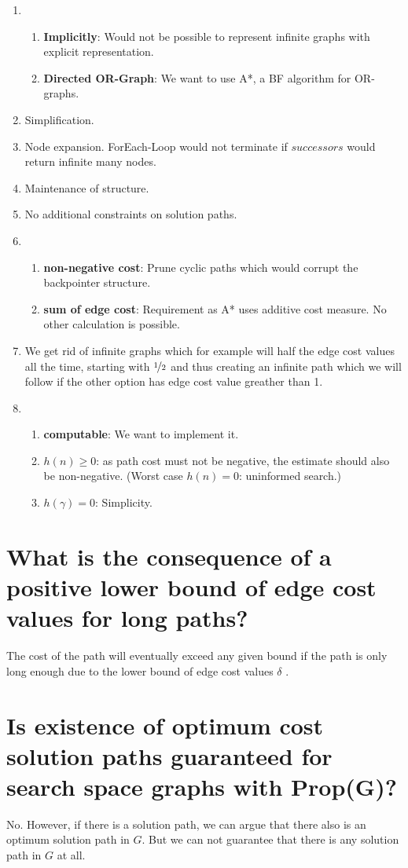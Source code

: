 \documentclass[12pt, a4paper]{article}
\begin{document}
\begin{enumerate}
\item 
	\begin{enumerate}[label=(\alph*)] 
	\item \textbf{Implicitly}: Would not be possible to represent infinite graphs with explicit representation.
	\item \textbf{Directed OR-Graph}: We want to use A*, a BF algorithm for OR-graphs.
	\end{enumerate}
\item Simplification.
\item Node expansion. ForEach-Loop would not terminate if $successors$ would return infinite many nodes.
\item Maintenance of structure.
\item No additional constraints on solution paths.
\item 
	\begin{enumerate}[label=(\alph*)] 
	\item \textbf{non-negative cost}: Prune cyclic paths which would corrupt the backpointer structure.
	\item \textbf{sum of edge cost}: Requirement as A* uses additive cost measure. No other calculation is possible.
	\end{enumerate}
\item We get rid of infinite graphs which for example will half the edge cost values all the time, starting with $\nicefrac{1}{2}$ and thus creating an infinite path which we will follow if the other option has edge cost value greather than 1.
\item 
	\begin{enumerate}[label=(\alph*)] 
	\item \textbf{computable}: We want to implement it.
	\item \textbf{$h(n) \geq 0$}: as path cost must not be negative, the estimate should also be non-negative. (Worst case $h(n) = 0$: uninformed search.)
	\item \textbf{$h(\gamma) = 0$}: Simplicity.
	\end{enumerate}
\end{enumerate}

\section{What is the consequence of a positive lower bound of edge cost values for long paths?}
The cost of the path will eventually exceed any given bound if the path is only long enough due to the lower bound of edge cost values $\delta$ .

\section{Is existence of optimum cost solution paths guaranteed for search space graphs with Prop(G)?}
No. However, if there is a solution path, we can argue that there also is an optimum solution path in $G$. But we can not guarantee that there is any solution path in $G$ at all.
\end{document}
